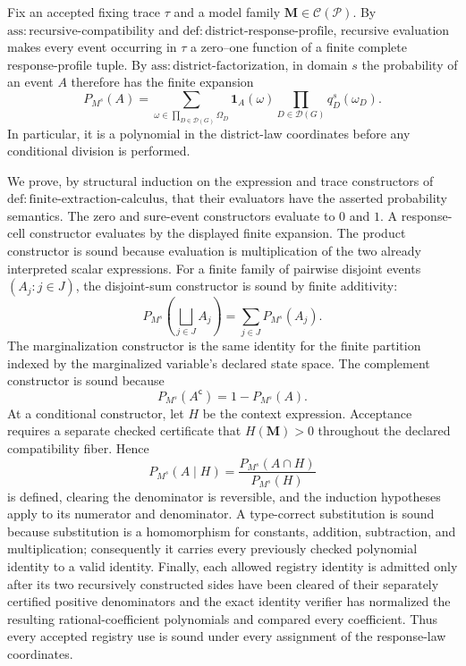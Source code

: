 Fix an accepted fixing trace \(\tau\) and a model family \(\mathbf M\in\mathcal C(\mathcal P)\).  By \(\mathrm{ass:recursive\text{-}compatibility}\) and \(\mathrm{def:district\text{-}response\text{-}profile}\), recursive evaluation makes every event occurring in \(\tau\) a zero--one function of a finite complete response-profile tuple.  By \(\mathrm{ass:district\text{-}factorization}\), in domain \(s\) the probability of an event \(A\) therefore has the finite expansion
\[
 P_{M^s}(A)
 =\sum_{\omega\in\prod_{D\in\mathcal D(G)}\Omega_D}
 \mathbf 1_A(\omega)
 \prod_{D\in\mathcal D(G)}q_D^s(\omega_D).
\]
In particular, it is a polynomial in the district-law coordinates before any conditional division is performed.

We prove, by structural induction on the expression and trace constructors of \(\mathrm{def:finite\text{-}extraction\text{-}calculus}\), that their evaluators have the asserted probability semantics.  The zero and sure-event constructors evaluate to \(0\) and \(1\).  A response-cell constructor evaluates by the displayed finite expansion.  The product constructor is sound because evaluation is multiplication of the two already interpreted scalar expressions.  For a finite family of pairwise disjoint events \((A_j:j\in J)\), the disjoint-sum constructor is sound by finite additivity:
\[
 P_{M^s}\!\left(\bigsqcup_{j\in J}A_j\right)
 =\sum_{j\in J}P_{M^s}(A_j).
\]
The marginalization constructor is the same identity for the finite partition indexed by the marginalized variable's declared state space.  The complement constructor is sound because
\[
 P_{M^s}(A^{\mathsf c})=1-P_{M^s}(A).
\]
At a conditional constructor, let \(H\) be the context expression.  Acceptance requires a separate checked certificate that \(H(\mathbf M)>0\) throughout the declared compatibility fiber.  Hence
\[
 P_{M^s}(A\mid H)=\frac{P_{M^s}(A\cap H)}{P_{M^s}(H)}
\]
is defined, clearing the denominator is reversible, and the induction hypotheses apply to its numerator and denominator.  A type-correct substitution is sound because substitution is a homomorphism for constants, addition, subtraction, and multiplication; consequently it carries every previously checked polynomial identity to a valid identity.  Finally, each allowed registry identity is admitted only after its two recursively constructed sides have been cleared of their separately certified positive denominators and the exact identity verifier has normalized the resulting rational-coefficient polynomials and compared every coefficient.  Thus every accepted registry use is sound under every assignment of the response-law coordinates.

